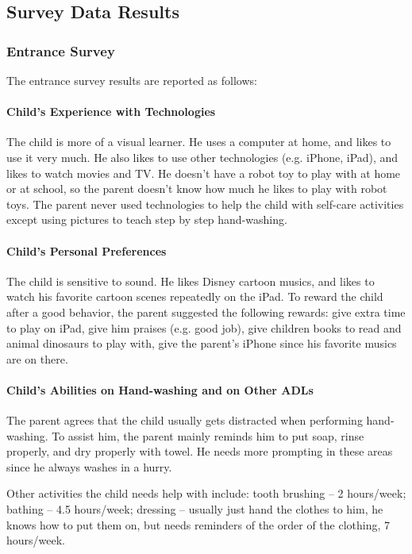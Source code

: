 \subsection{Survey Data Results}

\subsubsection{Entrance Survey}
The entrance survey results are reported as follows:

\paragraph{Child's Experience with Technologies}
The child is more of a visual learner.  He uses a computer at home, and likes to use it very much.  He also likes to use other technologies (e.g. iPhone, iPad), and likes to watch movies and TV.  He doesn't have a robot toy to play with at home or at school, so the parent doesn't know how much he likes to play with robot toys.  The parent never used technologies to help the child with self-care activities except using pictures to teach step by step hand-washing.

\paragraph{Child's Personal Preferences}
The child is sensitive to sound.  He likes Disney cartoon musics, and likes to watch his favorite cartoon scenes repeatedly on the iPad.  To reward the child after a good behavior, the parent suggested the following rewards: give extra time to play on iPad, give him praises (e.g. good job), give children books to read and animal dinosaurs to play with, give the parent's iPhone since his favorite musics are on there.

\paragraph{Child's Abilities on Hand-washing and on Other ADLs}
The parent agrees that the child usually gets distracted when performing hand-washing.  To assist him, the parent mainly reminds him to put soap, rinse properly, and dry properly with towel.  He needs more prompting in these areas since he always washes in a hurry.

Other activities the child needs help with include:  tooth brushing -- 2 hours/week; bathing -- 4.5 hours/week; dressing -- usually just hand the clothes to him, he knows how to put them on, but needs reminders of the order of the clothing, 7 hours/week.

